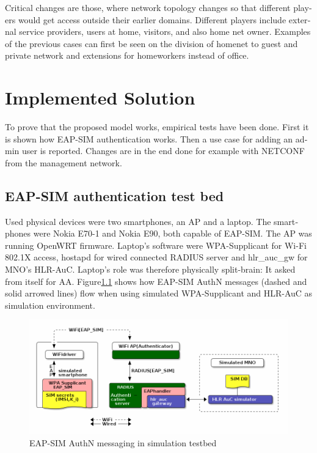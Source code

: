 \documentclass[12pt,a4paper,english]{tutthesis}
\begin{document}
\begin{otherlanguage}{english}
Critical changes are those, where network topology changes so
that different players would get access outside their earlier domains.
Different players include external service providers, users at home,
visitors, and also home net owner. Examples of the previous cases can first be
seen on the division of homenet to guest and private network and
extensions for homeworkers instead of office.


\chapter{Implemented Solution}
\label{sec-5}


To prove that the proposed model works, empirical tests have been done.
First it is shown how EAP-SIM authentication works. Then a use case for
adding an admin user is reported. Changes are in the end done 
for example with NETCONF from the management network.

\section{EAP-SIM authentication test bed}
\label{sec-5-1}



Used physical devices were two smartphones, an AP and a laptop.
The smartphones were Nokia E70-1 and Nokia E90, both capable of EAP-SIM.
The AP was running OpenWRT firmware.  
Laptop's software were WPA-Supplicant for Wi-Fi 802.1X access,
hostapd for wired connected RADIUS server and hlr\_auc\_gw for MNO's
HLR-AuC. Laptop's role was therefore physically split-brain: It asked from itself for AA. 
Figure\ref{eap-sim-testbed} shows how EAP-SIM AuthN messages (dashed
and solid arrowed lines) flow when using 
simulated WPA-Supplicant and HLR-AuC as simulation environment.

\begin{figure}[htb]
\centering
\includegraphics[width=.9\linewidth]{demoinfra.png}
\caption{\label{eap-sim-testbed}EAP-SIM AuthN messaging in simulation testbed}
\end{figure}





\end{otherlanguage}
\end{document}
